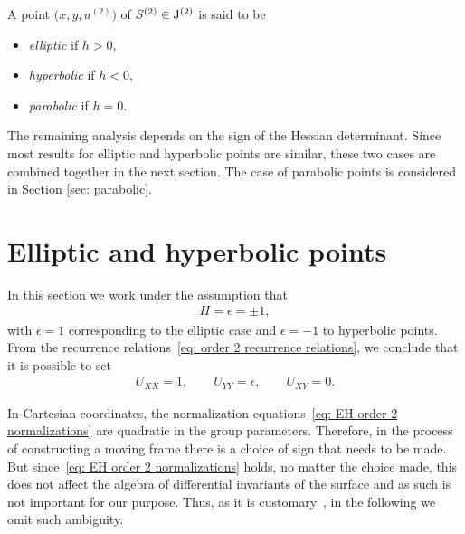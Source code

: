 \documentclass[pdftex]{sigma}%
\numberwithin{equation}{section}
\newcommand{\J}{{\rm J}}
\begin{document}
\begin{Definition}
A point $\big(x,y,u^{(2)}\big)$ of $S^{(2)} \in \J^{(2)}$ is said to be
\begin{itemize}
\item \emph{elliptic} if $h>0$,
\item \emph{hyperbolic} if $h<0$,
\item \emph{parabolic} if $h=0$.
\end{itemize}
\end{Definition}

The remaining analysis depends on the sign of the Hessian determinant. Since most results for elliptic and hyperbolic points are similar, these two cases are combined together in the next section. The case of parabolic points is considered in Section \ref{sec: parabolic}.

\section{Elliptic and hyperbolic points}\label{sec:elliptic-hyperbolic}

In this section we work under the assumption that
\begin{gather*}
H = \epsilon = \pm 1,
\end{gather*}
with $\epsilon=1$ corresponding to the elliptic case and $\epsilon = -1$ to hyperbolic points. From the recurrence relations~\eqref{eq: order 2 recurrence relations}, we conclude that it is possible to set
%
\begin{gather}\label{eq: EH order 2 normalizations}
U_{XX} = 1,\qquad U_{YY} = \epsilon,\qquad U_{XY}=0.
\end{gather}

\begin{Remark}\label{remark:ambiguity}
In Cartesian coordinates, the normalization equations~\eqref{eq: EH order 2 normalizations} are quadratic in the group parameters. Therefore, in the process of constructing a moving frame there is a choice of sign that needs to be made. But since~\eqref{eq: EH order 2 normalizations} holds, no matter the choice made, this does not affect the algebra of differential invariants of the surface and as such is not important for our purpose. Thus, as it is customary~\cite{O-2016}, in the following we omit such ambiguity.
\end{Remark}
\end{document}
